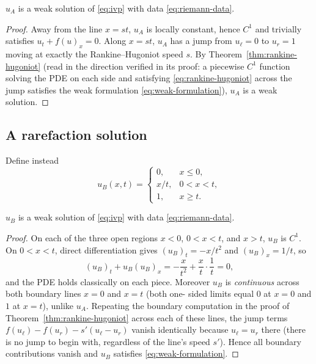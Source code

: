 \begin{proposition}
\label{prop:shock-is-weak-solution}
$u_A$ is a weak solution of \eqref{eq:ivp} with data \eqref{eq:riemann-data}.
\end{proposition}

\begin{proof}
Away from the line $x=st$, $u_A$ is locally constant, hence $C^1$ and
trivially satisfies $u_t+f(u)_x=0$. Along $x=st$, $u_A$ has a jump from
$u_\ell=0$ to $u_r=1$ moving at exactly the Rankine--Hugoniot speed $s$.
By Theorem~\ref{thm:rankine-hugoniot} (read in the direction verified in
its proof: a piecewise $C^1$ function solving the PDE on each side and
satisfying \eqref{eq:rankine-hugoniot} across the jump satisfies the weak
formulation \eqref{eq:weak-formulation}), $u_A$ is a weak solution.
\end{proof}

\subsection{A rarefaction solution}
\label{subsec:nonuniq-rarefaction}

Define instead
\begin{equation}
  \label{eq:rarefaction-solution}
  u_B(x,t) = \begin{cases}
    0, & x \le 0, \\
    x/t, & 0 < x < t, \\
    1, & x \ge t.
  \end{cases}
\end{equation}

\begin{proposition}
\label{prop:rarefaction-is-weak-solution}
$u_B$ is a weak solution of \eqref{eq:ivp} with data \eqref{eq:riemann-data}.
\end{proposition}

\begin{proof}
On each of the three open regions $x<0$, $0<x<t$, and $x>t$, $u_B$ is
$C^1$. On $0<x<t$, direct differentiation gives $(u_B)_t = -x/t^2$ and
$(u_B)_x = 1/t$, so
\begin{equation}
  (u_B)_t + u_B (u_B)_x = -\frac{x}{t^2} + \frac{x}{t}\cdot\frac{1}{t} = 0,
\end{equation}
and the PDE holds classically on each piece. Moreover $u_B$ is
\emph{continuous} across both boundary lines $x=0$ and $x=t$ (both one-
sided limits equal $0$ at $x=0$ and $1$ at $x=t$), unlike $u_A$. Repeating
the boundary computation in the proof of
Theorem~\ref{thm:rankine-hugoniot} across each of these lines, the jump
terms $f(u_\ell)-f(u_r) - s'(u_\ell - u_r)$ vanish identically because
$u_\ell = u_r$ there (there is no jump to begin with, regardless of the
line's speed $s'$). Hence all boundary contributions vanish and $u_B$
satisfies \eqref{eq:weak-formulation}.
\end{proof}

